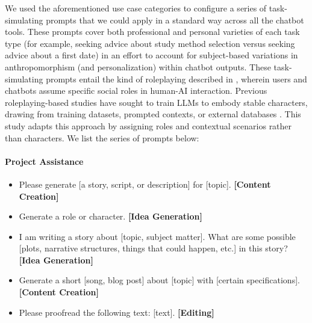 We used the aforementioned use case categories to configure a series of task-simulating prompts that we could apply in a standard way across all the chatbot tools. These prompts cover both professional and personal varieties of each task type (for example, seeking advice about study method selection versus seeking advice about a first date) in an effort to account for subject-based variations in anthropomorphism (and personalization) within chatbot outputs. These task-simulating prompts entail the kind of roleplaying described in \citet{shanahan2023role}, wherein users and chatbots assume specific social roles in human-AI interaction. Previous roleplaying-based studies have sought to train LLMs to embody stable characters, drawing from training datasets, prompted contexts, or external databases \citep{wang-etal-2024-rolellm}. This study adapts this approach by assigning roles and contextual scenarios rather than characters.
We list the series of prompts below:


\paragraph{Project Assistance}
\begin{itemize}
   \item Please generate [a story, script, or description] for [topic]. \textbf{[Content Creation]}
   \item Generate a role or character. \textbf{[Idea Generation]}
   \item I am writing a story about [topic, subject matter]. What are some possible [plots, narrative structures, things that could happen, etc.] in this story? \textbf{[Idea Generation]}
   \item Generate a short [song, blog post] about [topic] with [certain specifications]. \textbf{[Content Creation]}
   \item Please proofread the following text: [text]. \textbf{[Editing]}
\end{itemize}

